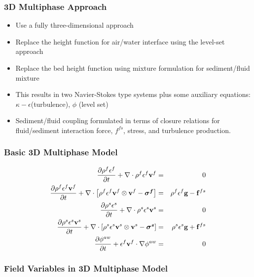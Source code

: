 \documentclass{beamer}
\begin{document}
\begin{frame}
\frametitle{3D Multiphase Approach}
\begin{itemize}
\item Use a fully three-dimensional approach
\item Replace the height function for air/water interface using the level-set approach
\item Replace the bed height function using mixture formulation for sediment/fluid mixture
\item This results in two Navier-Stokes type systems plus some auxiliary equations: $\kappa-\epsilon$(turbulence), $\phi$ (level set)
\item Sediment/fluid coupling formulated in terms of closure relations for fluid/sediment interaction force, $f^{fs}$, stress, and turbulence production.
\end{itemize}
\end{frame}

\begin{frame}
\frametitle{Basic 3D Multiphase Model}
\begin{eqnarray}
  \frac{\partial {\rho^f \epsilon^f}}{\partial {t}} + \nabla \cdot \rho^f \epsilon^f {\bf v}^f &=& 0 \\ 
  \frac{\partial {\rho^f \epsilon^f {\bf v}^f }}{\partial {t}} + \nabla \cdot \left[ \rho^f \epsilon^f {\bf v}^f \otimes {\bf v}^f - \mbox{{\boldmath ${\sigma^f}$}} \right]&=& \rho^f \epsilon^f {\bf g}  - {\bf f}^{fs} \\
  \frac{\partial {\rho^s \epsilon^s}}{\partial {t}} + \nabla \cdot \rho^s \epsilon^s {\bf v}^s &=& 0 \\ 
  \frac{\partial {\rho^s \epsilon^s {\bf v}^s}}{\partial {t}} + \nabla \cdot \left[ \rho^s \epsilon^s {\bf v}^s \otimes {\bf v}^s - \mbox{{\boldmath ${\sigma^s}$}} \right] &=& \rho^s \epsilon^s {\bf g}  + {\bf f}^{fs} \\
  \frac{\partial {\phi^{aw}}}{\partial {t}} + \epsilon^f {\bf v}^f \cdot  \nabla \phi^{aw} &=& 0 
\end{eqnarray}
\end{frame}

\begin{frame}
\frametitle{Field Variables in 3D Multiphase Model}
\begin{center}
  \def\svgwidth{\textwidth}
  
\end{center}
\end{frame}

\end{document}

